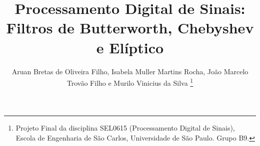 \documentclass[conference]{IEEEtran}
\begin{document}
\title{Processamento Digital de Sinais: Filtros de Butterworth, Chebyshev e Elíptico}

\author{Aruan Bretas de Oliveira Filho, Isabela Muller Martins Rocha, João Marcelo Trovão Filho e Murilo Vinicius da Silva
\thanks{Projeto Final da disciplina SEL0615 (Processamento Digital de Sinais), Escola de Engenharia de São Carlos, Universidade de São Paulo. Grupo B9.}}

\maketitle
\raggedbottom










\appendix

\end{document}
